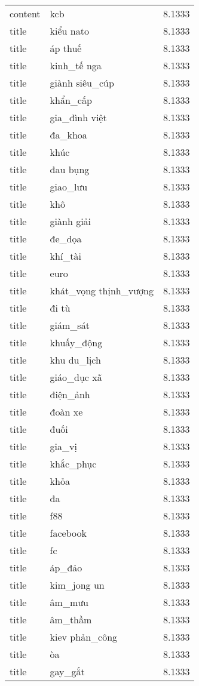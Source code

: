 \documentclass{article}
\begin{document}
\begin{tabular}{lll}
content & kcb & 8.1333\\
title & kiểu nato & 8.1333\\
title & áp thuế & 8.1333\\
title & kinh\_tế nga & 8.1333\\
title & giành siêu\_cúp & 8.1333\\
title & khẩn\_cấp & 8.1333\\
title & gia\_đình việt & 8.1333\\
title & đa\_khoa & 8.1333\\
title & khúc & 8.1333\\
title & đau bụng & 8.1333\\
title & giao\_lưu & 8.1333\\
title & khô & 8.1333\\
title & giành giải & 8.1333\\
title & đe\_dọa & 8.1333\\
title & khí\_tài & 8.1333\\
title & euro & 8.1333\\
title & khát\_vọng thịnh\_vượng & 8.1333\\
title & đi tù & 8.1333\\
title & giám\_sát & 8.1333\\
title & khuấy\_động & 8.1333\\
title & khu du\_lịch & 8.1333\\
title & giáo\_dục xã & 8.1333\\
title & điện\_ảnh & 8.1333\\
title & đoàn xe & 8.1333\\
title & đuối & 8.1333\\
title & gia\_vị & 8.1333\\
title & khắc\_phục & 8.1333\\
title & khỏa & 8.1333\\
title & đa & 8.1333\\
title & f88 & 8.1333\\
title & facebook & 8.1333\\
title & fc & 8.1333\\
title & áp\_đảo & 8.1333\\
title & kim\_jong un & 8.1333\\
title & âm\_mưu & 8.1333\\
title & âm\_thầm & 8.1333\\
title & kiev phản\_công & 8.1333\\
title & òa & 8.1333\\
title & gay\_gắt & 8.1333\\

\end{tabular}
\end{document}
